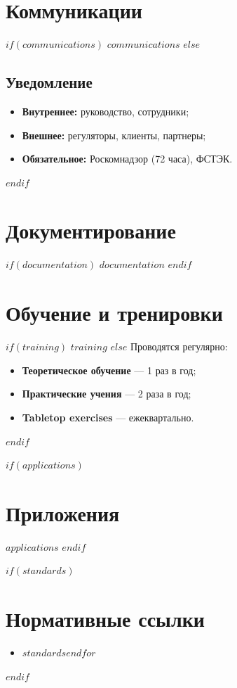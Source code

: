 \documentclass[14pt,a4paper]{extarticle}
\begin{document}
\section{Коммуникации}
\label{sec:communications}

$if(communications)$
$communications$
$else$
\subsection{Уведомление}
\begin{itemize}
    \item \textbf{Внутреннее:} руководство, сотрудники;
    \item \textbf{Внешнее:} регуляторы, клиенты, партнеры;
    \item \textbf{Обязательное:} Роскомнадзор (72 часа), ФСТЭК.
\end{itemize}
$endif$

\section{Документирование}
\label{sec:documentation}

$if(documentation)$
$documentation$
$endif$

\section{Обучение и тренировки}
\label{sec:training}

$if(training)$
$training$
$else$
Проводятся регулярно:
\begin{itemize}
    \item \textbf{Теоретическое обучение} — 1 раз в год;
    \item \textbf{Практические учения} — 2 раза в год;
    \item \textbf{Tabletop exercises} — ежеквартально.
\end{itemize}
$endif$

$if(applications)$
\newpage
\appendix
\section*{Приложения}
$applications$
$endif$

$if(standards)$
\newpage
\section*{Нормативные ссылки}
\begin{itemize}
$for(standards)$\item $standards$$endfor$
\end{itemize}
$endif$
\end{document}
